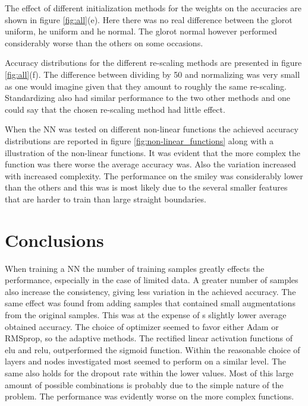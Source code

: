 \documentclass[prl,twocolumn]{revtex4-1}
\begin{document}
The effect of different initialization methods for the weights on the accuracies are shown in figure \ref{fig:all}(e). Here there was no real difference between the glorot uniform, he uniform and he normal. The glorot normal however performed considerably worse than the others on some occasions.

Accuracy distributions for the different re-scaling methods are presented in figure \ref{fig:all}(f). The difference between dividing by 50 and normalizing was very small as one would imagine given that they amount to roughly the same re-scaling. Standardizing also had similar performance to the two other methods and one could say that the chosen re-scaling method had little effect. 


When the NN was tested on different non-linear functions the achieved accuracy distributions are reported in figure \ref{fig:non-linear_functions} along with a illustration of the non-linear functions. It was evident that the more complex the function was there worse the average accuracy was. Also the variation increased with increased complexity. The performance on the smiley was considerably lower than the others and this was is most likely due to the several smaller features that are harder to train than large straight boundaries. 



\section{Conclusions}

When training a NN the number of training samples greatly effects the performance, especially in the case of limited data. A greater number of samples also increase the consistency, giving less variation in the achieved accuracy. The same effect was found from adding samples that contained small augmentations from the original samples. This was at the expense of s slightly lower average obtained accuracy. The choice of optimizer seemed to favor either Adam or RMSprop, so the adaptive methods. The rectified linear activation functions of elu and relu, outperformed the sigmoid function. Within the reasonable choice of layers and nodes investigated most seemed to perform on a similar level. The same also holds for the dropout rate within the lower values. Most of this large amount of possible combinations is probably due to the simple nature of the problem. The performance was evidently worse on the more complex functions.
\end{document}
